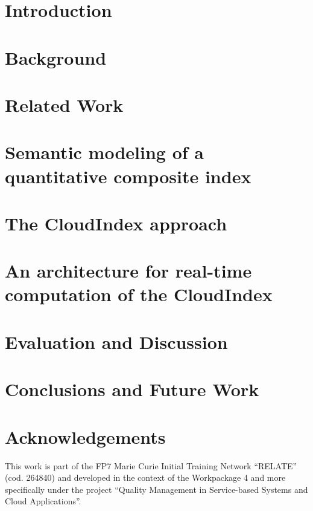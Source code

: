 \documentclass{llncs}
\begin{document}
\section{Introduction}
% 
\section{Background}
% 
\section{Related Work}
% 
\section{Semantic modeling of a quantitative composite index}
% 
\section{The CloudIndex approach}
% 
\section{An architecture for real-time computation of the CloudIndex}
% 
\section{Evaluation and Discussion}
% 
\section{Conclusions and Future Work}
% 

\section{Acknowledgements}
This work is part of the FP7 Marie Curie Initial Training Network ``RELATE'' (cod. 264840) and developed in the context 
of the Workpackage 4 and more specifically under the project ``Quality Management in Service-based Systems and Cloud Applications''.

\clearpage



\end{document}
